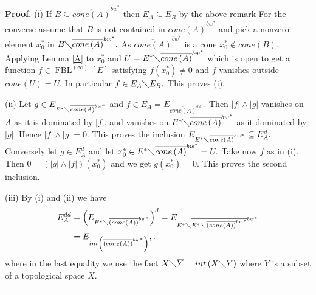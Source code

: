 \documentclass[12pt]{article}%
\newenvironment{proof}[1][Proof]{\noindent\textbf{#1.} }{\ \rule{0.5em}{0.5em}}
\begin{document}
\begin{proof}
(i) If $B\subseteq\overline{cone\left(  A\right)  }^{bw^{\ast}}$ then
$E_{A}\subseteq E_{B}$ by the above remark For the converse assume that $B$ is
not contained in $\overline{cone\left(  A\right)  }^{bw^{\ast}}$ and pick a
nonzero element $x_{0}^{\ast}$ in $B\diagdown\overline{cone\left(  A\right)
}^{bw^{\ast}}.$ As $\overline{cone\left(  A\right)  }^{bw^{\ast}}$ is a cone
$x_{0}^{\ast}\notin cone\left(  B\right)  .$ Applying Lemma \ref{A} to
$x_{0}^{\ast}$ and $U=E^{\ast}\diagdown\overline{cone\left(  A\right)
}^{bw^{\ast}}$ which is open to get a function $f\in\operatorname*{FBL}%
\nolimits^{\left(  \infty\right)  }\left[  E\right]  $ satisfying $f\left(
x_{0}^{\ast}\right)  \neq0$ and $f$ vanishes outside $cone\left(  U\right)
=U.$ In particular $f\in E_{A}\diagdown E_{B}.$ This proves (i).

(ii) Let $g\in E_{E^{\ast}\diagdown\overline{cone\left(  A\right)  }%
^{bw^{\ast}}}$ and $f\in E_{A}=E_{\overline{cone\left(  A\right)  }^{bw^{\ast
}}}.$ Then $\left\vert f\right\vert \wedge\left\vert g\right\vert $ vanishes
on $A$ as it is dominated by $\left\vert f\right\vert $, and vanishes on
$E^{\ast}\diagdown\overline{cone\left(  A\right)  }^{bw^{\ast}}$ as it
dominated by $\left\vert g\right\vert .$ Hence $\left\vert f\right\vert
\wedge\left\vert g\right\vert =0.$ This proves the inclusion $E_{E^{\ast
}\diagdown\overline{cone\left(  A\right)  }^{bw^{\ast}}}\subseteq E_{A}^{d}.$
Conversely let $g\in E_{A}^{d}$ and let $x_{0}^{\ast}\in E^{\ast}%
\diagdown\overline{cone\left(  A\right)  }^{bw^{\ast}}=U.$ Take now $f$ as in
(i). Then $0=\left(  \left\vert g\right\vert \wedge\left\vert f\right\vert
\right)  \left(  x_{0}^{\ast}\right)  $ and we get $g\left(  x_{0}^{\ast
}\right)  =0.$ This proves the second inclusion.

(iii) By (i) and (ii) we have%
\begin{align*}
E_{A}^{dd}  &  =\left(  E_{E^{\ast}\diagdown\overline{\left(  cone\left(
A\right)  \right)  }^{bw^{\ast}}}\right)  ^{d}=E_{E^{\ast}\diagdown
\overline{E^{\ast}\diagdown\overline{\left(  cone\left(  A\right)  \right)
}^{bw^{\ast}}}^{bw^{\ast}}}\\
&  =E_{int\left(  \overline{\left(  cone\left(  A\right)  \right)  }%
^{bw^{\ast}}\right)  },.
\end{align*}
where in the last equality we use the fact $X\diagdown\overline{Y}=int\left(
X\diagdown Y\right)  $ where $Y$ is a subset of a topological space $X.$
\end{proof}
\end{document}

